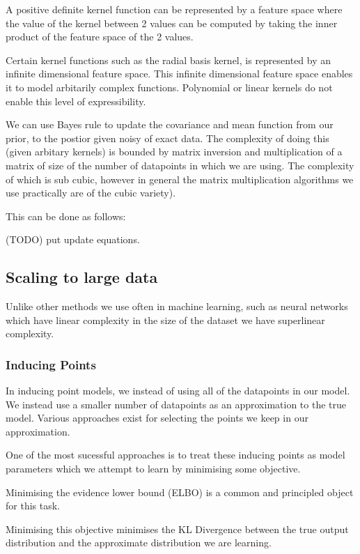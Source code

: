 \documentclass[12pt, a4paper]{report}
\theoremstyle{definition}
\begin{document}
A positive definite kernel function can be represented by a feature space where the value of the kernel between 2 values can be computed by taking the inner product of the feature space of the 2 values.

Certain kernel functions such as the radial basis kernel, is represented by an infinite dimensional feature space. This infinite dimensional feature space enables it to model arbitarily complex functions. Polynomial or linear kernels do not enable this level of expressibility.

We can use Bayes rule to update the covariance and mean function from our prior, to the postior given noisy of exact data. The complexity of doing this (given arbitary kernels) is bounded by matrix inversion and  multiplication of a matrix of size of the number of datapoints in which we are using. The complexity of which is sub cubic, however in general the matrix multiplication algorithms we use practically are of the cubic variety).

This can be done as follows: 

(TODO) put update equations.

\subsection{Scaling to large data}

Unlike other methods we use often in machine learning, such as neural networks which have linear complexity in the size of the dataset we have superlinear complexity.

\subsubsection{Inducing Points}

In inducing point models, we instead of using all of the datapoints in our model. We instead use a smaller number of datapoints as an approximation to the true model. Various approaches exist for selecting the points we keep in our approximation.

One of the most sucessful approaches is to treat these inducing points as model parameters which we attempt to learn by minimising some objective.

Minimising the evidence lower bound (ELBO) is a common and principled object for this task.

Minimising this objective minimises the KL Divergence between the true output distribution and the approximate distribution we are learning.
\end{document}
